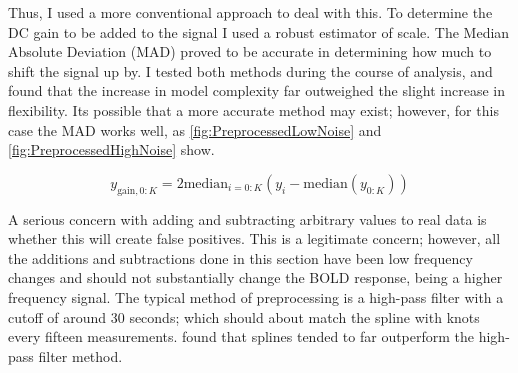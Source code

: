 Thus, I used a more conventional approach to deal with this. To determine
the DC gain to be added to the signal I used a robust estimator 
of scale. The Median Absolute Deviation (MAD)
proved to be accurate in determining how much to shift the signal up
by. I tested both methods during the course of analysis, and found that the increase 
in model complexity far outweighed the slight increase in flexibility. Its 
possible that a more accurate method may exist; however, for this case the 
MAD works well, as \autoref{fig:PreprocessedLowNoise} and \autoref{fig:PreprocessedHighNoise} show. 

\begin{equation}
y_{\text{gain}, 0:K} = 2\text{median}_{i=0:K}(y_i - \text{median}(y_{0:K}))
\end{equation}

A serious concern with adding and subtracting arbitrary values to 
real data is whether this will create false positives. This is a legitimate
concern; however, all the additions and subtractions done in this section
have been low frequency changes and should not substantially change
the BOLD response, being a higher frequency signal. The typical
method of preprocessing is a high-pass filter with a cutoff of around 30
seconds; which should about match the spline with knots every fifteen 
measurements. \cite{Tanabe2002} found that splines tended to far outperform the
high-pass filter method. 

